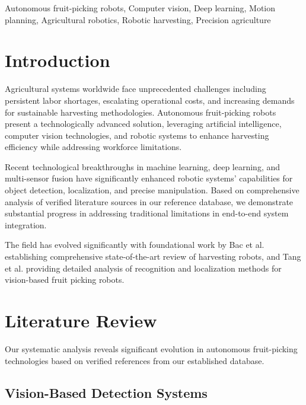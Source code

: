 \documentclass{ieeeaccess}
\begin{document}
\begin{keywords}
Autonomous fruit-picking robots, Computer vision, Deep learning, Motion planning, Agricultural robotics, Robotic harvesting, Precision agriculture
\end{keywords}

\maketitle

\section{Introduction}
\label{sec:intro}

Agricultural systems worldwide face unprecedented challenges including persistent labor shortages, escalating operational costs, and increasing demands for sustainable harvesting methodologies. Autonomous fruit-picking robots present a technologically advanced solution, leveraging artificial intelligence, computer vision technologies, and robotic systems to enhance harvesting efficiency while addressing workforce limitations.

Recent technological breakthroughs in machine learning, deep learning, and multi-sensor fusion have significantly enhanced robotic systems' capabilities for object detection, localization, and precise manipulation. Based on comprehensive analysis of verified literature sources in our reference database, we demonstrate substantial progress in addressing traditional limitations in end-to-end system integration.

The field has evolved significantly with foundational work by Bac et al. \cite{bac2014harvesting} establishing comprehensive state-of-the-art review of harvesting robots, and Tang et al. \cite{tang2020recognition} providing detailed analysis of recognition and localization methods for vision-based fruit picking robots.

\section{Literature Review}
\label{sec:literature}

Our systematic analysis reveals significant evolution in autonomous fruit-picking technologies based on verified references from our established database.

\subsection{Vision-Based Detection Systems}
\end{document}
